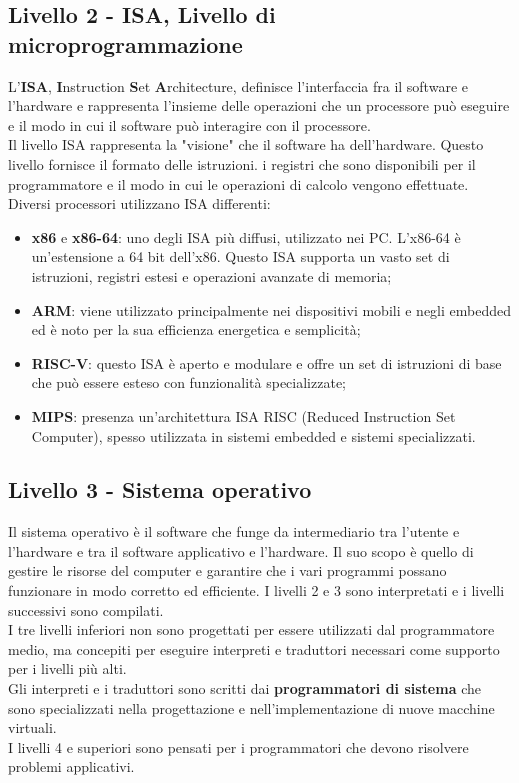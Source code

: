 \documentclass[12pt]{report}
\begin{document}
		\subsection{Livello 2 - ISA, Livello di microprogrammazione}
		L'\textbf{ISA}, \textbf{I}nstruction \textbf{S}et \textbf{A}rchitecture, definisce l'interfaccia fra il software e l'hardware e rappresenta l'insieme delle operazioni che un processore può eseguire e il modo in cui il software può interagire con il processore.
		\\
		Il livello ISA rappresenta la "visione" che il software ha dell'hardware. Questo livello fornisce il formato delle istruzioni. i registri che sono disponibili per il programmatore e il modo in cui le operazioni di calcolo vengono effettuate.
		Diversi processori utilizzano ISA differenti:
		\begin{itemize}
			\item \textbf{x86} e \textbf{x86-64}: uno degli ISA più diffusi, utilizzato nei PC. L'x86-64 è un'estensione a 64 bit dell'x86. Questo ISA supporta un vasto set di istruzioni, registri estesi e operazioni avanzate di memoria;
			\item \textbf{ARM}: viene utilizzato principalmente nei dispositivi mobili e negli embedded ed è noto per la sua efficienza energetica  e semplicità;
			\item \textbf{RISC-V}: questo ISA è aperto e modulare e offre un set di istruzioni di base che può essere esteso con funzionalità specializzate;
			\item \textbf{MIPS}: presenza un'architettura ISA RISC (Reduced Instruction Set Computer), spesso utilizzata in sistemi embedded e sistemi specializzati.
		\end{itemize}
		\subsection{Livello 3 - Sistema operativo}
		Il sistema operativo è il software che funge da intermediario tra l'utente e l'hardware e tra il software applicativo e l'hardware.
		Il suo scopo è quello di gestire le risorse del computer e garantire che i vari programmi possano funzionare in modo corretto ed efficiente.
		I livelli 2 e 3 sono interpretati e i livelli successivi sono compilati. \\
		I tre livelli inferiori non sono progettati per essere utilizzati dal programmatore medio, ma concepiti per eseguire interpreti e traduttori necessari come supporto per i livelli più alti. \\
		Gli interpreti e i traduttori sono scritti dai \textbf{programmatori di sistema} che sono specializzati nella progettazione e nell'implementazione di nuove macchine virtuali. \\
		I livelli 4 e superiori sono pensati per i programmatori che devono risolvere problemi applicativi.
\end{document}
